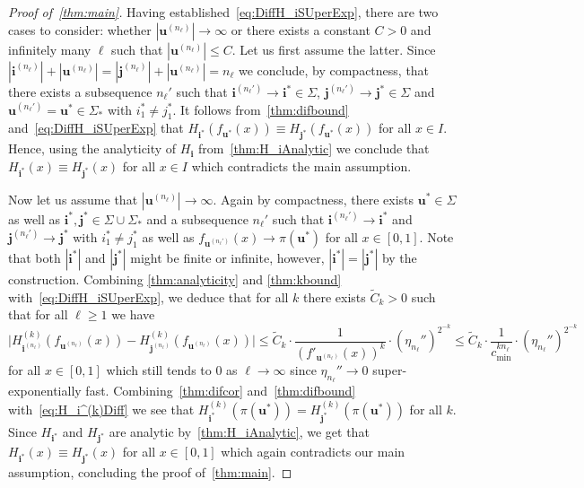 \documentclass[11pt,]{article}
\def\cref#1{\ref{#1}}%
\theoremstyle{definition}
\theoremstyle{remark}
\newcommand{\0}{\mathbf{0}}
\newcommand{\bi}{\mathbf{i}}
\newcommand{\bj}{\mathbf{j}}
\newcommand{\bu}{\mathbf{u}}
\begin{document}
\begin{proof}[Proof of~\cref{thm:main}]
Having established~\cref{eq:DiffH_iSUperExp}, there are two cases to consider: whether
$|\bu^{(n_\ell)}| \to \infty$ or there exists a constant $C>0$ and infinitely many $\ell$ such that
$|\bu^{(n_\ell)}| \leq C$. Let us first assume the latter. Since $|\bi^{(n_\ell)}|+ |\bu^{(n_\ell)}|
= |\bj^{(n_\ell)}|+|\bu^{(n_\ell)}| = n_\ell$ we conclude, by compactness, that
there exists a subsequence $n_\ell'$ such that $\bi^{(n_\ell')} \to \bi^*\in\Sigma$,
$\bj^{(n_\ell')}\to\bj^*\in\Sigma$ and $\bu^{(n_\ell')}=\bu^*\in\Sigma_*$ with $i_1^*\neq j_1^*$.
It follows from~\cref{thm:difbound} and~\cref{eq:DiffH_iSUperExp} that
$
  H_{\bi^*}(f_{\bu^*}(x))\equiv H_{\bj^*}(f_{\bu^*}(x))
$
for all $x\in I$.  Hence, using the analyticity of $H_{\bi}$ from~\cref{thm:H_iAnalytic} we conclude
that $H_{\bi^*}(x) \equiv H_{\bj^*}(x)$ for all $x\in I$ which contradicts the main assumption.

Now let us assume that $|\bu^{(n_\ell)}| \to \infty$. Again by compactness, there exists
$\bu^*\in\Sigma$ as well as $\bi^*,\bj^*\in\Sigma\cup\Sigma_*$  and a
subsequence $n_\ell'$ such that $\bi^{(n_\ell')}\to \bi^*$ and $\bj^{(n_\ell')}\to \bj^*$ with
$i_1^*\neq j_1^*$ as well as $f_{\bu^{(n_\ell')}}(x) \to \pi(\bu^*)$ for all $x\in[0,1]$. Note that both $|\bi^*|$ and
	$|\bj^*|$ might be finite or infinite, however, $|\bi^*|=|\bj^*|$ by the construction. Combining
\cref{thm:analyticity} and \cref{thm:kbound} with~\cref{eq:DiffH_iSUperExp}, we deduce that for all
$k$ there
exists $\widetilde{C}_k>0$ such that for all $\ell\geq 1$ we have
\begin{equation}\label{eq:H_i^(k)Diff}
  \big|H_{\bi^{(n_\ell)}}^{(k)}(f_{\bu^{(n_\ell)}}(x)) - H_{\bj^{(n_\ell)}}^{(k)}(f_{\bu^{(n_\ell)}}(x))\big|
  \leq \widetilde{C}_k \cdot
  \frac{1}{(f'_{\bu^{(n_\ell)}}(x))^k}\cdot\left(\eta_{n_\ell}''\right)^{2^{-k}}\leq\widetilde{C}_k
  \cdot \frac{1}{c_{\min}^{k n_\ell}}\cdot\left(\eta_{n_\ell}''\right)^{2^{-k}}
\end{equation}
for all $x\in[0,1]$ which still tends to $0$ as $\ell\to\infty$ since $\eta_{n_{\ell}}''\to 0$
super-exponentially fast. Combining~\cref{thm:difcor} and~\cref{thm:difbound}
with~\cref{eq:H_i^(k)Diff} we see that $H_{\bi^*}^{(k)}(\pi(\bu^*))=H_{\bj^*}^{(k)}(\pi(\bu^*))$ for
all $k$.
Since $H_{\bi^*}$ and $H_{\bj^*}$ are analytic by~\cref{thm:H_iAnalytic}, we get that
$H_{\bi^*}(x)\equiv H_{\bj^*}(x)$ for all
$x\in[0,1]$ which again contradicts our main assumption, concluding the proof of~\cref{thm:main}. 
\end{proof}
\end{document}
